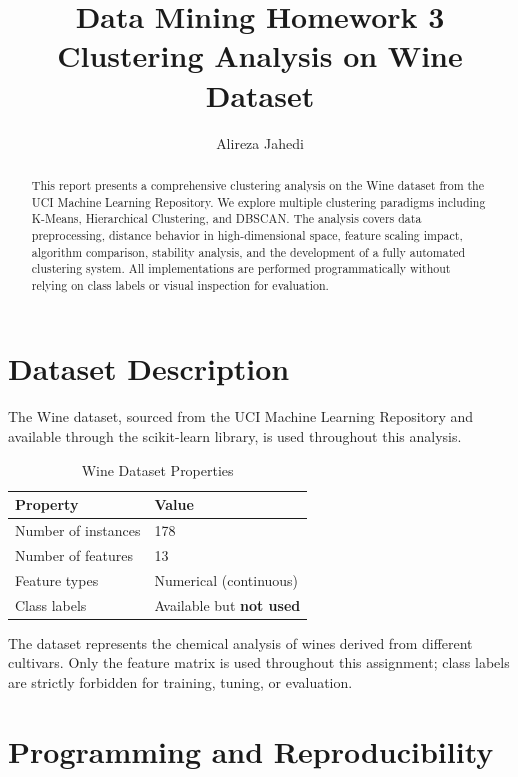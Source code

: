 \documentclass[12pt,a4paper]{article}
\title{\textbf{Data Mining Homework 3}\\[0.5em]
\Large Clustering Analysis on Wine Dataset}
\author{Alireza Jahedi}
\begin{document}
\maketitle

\begin{abstract}
This report presents a comprehensive clustering analysis on the Wine dataset from the UCI Machine Learning Repository. We explore multiple clustering paradigms including K-Means, Hierarchical Clustering, and DBSCAN. The analysis covers data preprocessing, distance behavior in high-dimensional space, feature scaling impact, algorithm comparison, stability analysis, and the development of a fully automated clustering system. All implementations are performed programmatically without relying on class labels or visual inspection for evaluation.
\end{abstract}

\section{Dataset Description}

The Wine dataset, sourced from the UCI Machine Learning Repository and available through the scikit-learn library, is used throughout this analysis.

\begin{table}[H]
\centering
\caption{Wine Dataset Properties}
\begin{tabular}{ll}
\toprule
\textbf{Property} & \textbf{Value} \\
\midrule
Number of instances & 178 \\
Number of features & 13 \\
Feature types & Numerical (continuous) \\
Class labels & Available but \textbf{not used} \\
\bottomrule
\end{tabular}
\end{table}

The dataset represents the chemical analysis of wines derived from different cultivars. Only the feature matrix is used throughout this assignment; class labels are strictly forbidden for training, tuning, or evaluation.

\section{Programming and Reproducibility}
\end{document}
